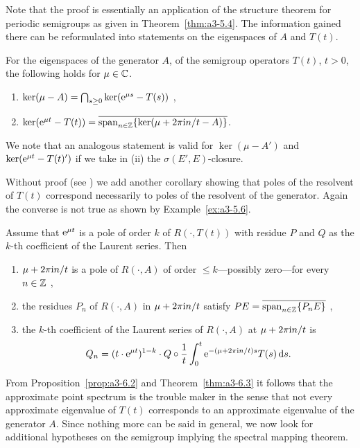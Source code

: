 Note that the proof is essentially an application of the structure theorem for periodic semigroups as given in Theorem~\ref{thm:a3-5.4}.
The information gained there can be reformulated into statements on the eigenspaces of\/ $A$ and $T(t)$.
\begin{corollary}\label{cor:a3-6.4}
For the eigenspaces of the generator $A$, \resp of the semigroup operators $T(t)$, $t > 0$, the following holds  for  $\mu \in \mathbb{C}$. 
\begin{enumerate}[\upshape (i)]
\item 
$\ker(\mu - A) = \bigcap_{s \geq 0} \ker(\eu^{\mu s} - T(s))$ ,

\item 
$\ker(\mathrm{e}^{\mu t} - T(t)) = \overline{\mathrm{span}_{n \in \mathbb{Z}} \{\ker(\mu + 2\pi\mathrm{i}  n/t - A)\}}$. 

\end{enumerate}
\end{corollary}
We note that an analogous statement is valid for $\ker(\mu - A')$ and $\ker(\mathrm{e}^{\mu t} - T(t)')$ if we take in (ii) the $\sigma(E',E)$-closure.

Without proof (see \textcite[Proposition~1.10]{greiner:1981}) we add another corollary showing that poles of the resolvent of\/ $T(t)$ correspond necessarily to poles of the resolvent of the generator.
Again the converse is not true as shown by Example~\ref{ex:a3-5.6}.
\begin{corollary}\label{cor:a3-6.5}
Assume that $\mathrm{e}^{\mu t}$ is a pole of order $k$ of\/ $R(\cdot,T(t))$ with residue $P$ and $Q$ as the $k$-th coefficient of the Laurent series.
Then
\begin{enumerate}[\upshape (i)]
\item 
$\mu + 2\pi\mathrm{i}  n/t$ is a pole of\/ $R(\cdot,A)$ of order $\leq k$---possibly zero---for every $n \in \mathbb{Z}$ ,

\item 
the residues $P_{n}$ of $R(\cdot,A)$ in $\mu + 2\pi\mathrm{i}  n/t$ satisfy $PE = \overline{\text{span}_{n \in \mathbb{Z}} \{P_{n}E\}}$ ,

\item 
the $k$-th coefficient of the Laurent series of\/ $R(\cdot,A)$ at $\mu + 2\pi\mathrm{i}  n/t$ is
\[
Q_{n} = (t \cdot \mathrm{e}^{\mu t})^{1-k} \cdot Q \circ \frac{1}{t} \int_{0}^{t} \mathrm{e}^{-(\mu+2\pi\mathrm{i}  n/t)s}T(s) \mathop{}\!\mathrm{d}{s} .
\]
\end{enumerate}
\end{corollary}
From Proposition~\ref{prop:a3-6.2} and Theorem~\ref{thm:a3-6.3} it follows that the approximate point spectrum 
is the trouble maker in the sense that not every approximate eigenvalue of\/ $T(t)$ corresponds to an approximate eigenvalue of the generator $A$.
Since nothing more can be said in general, we now look for additional hypotheses on the semigroup implying the spectral mapping theorem.


